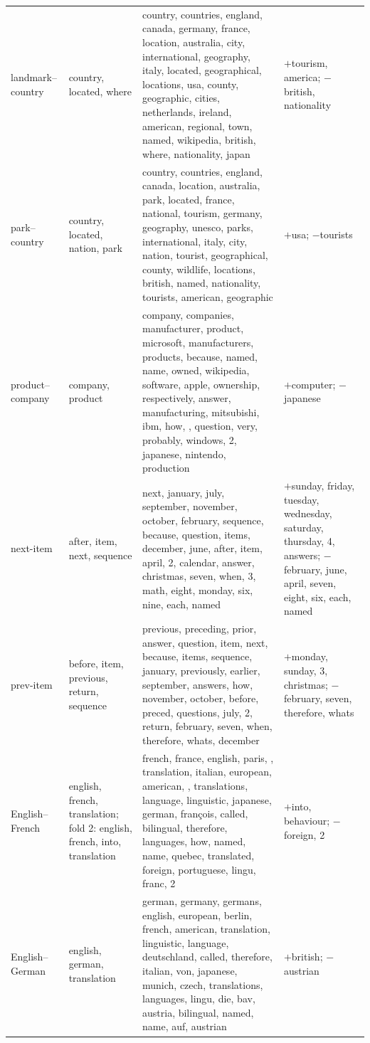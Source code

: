 \begin{xltabular}{\textwidth}{@{}>{\raggedright\arraybackslash}p{1.9cm}>{\raggedright\arraybackslash}p{2.3cm}>{\raggedright\arraybackslash}X>{\raggedright\arraybackslash}p{2.9cm}@{}}
landmark--country & country, located, where & country, countries, england, canada, germany, france, location, australia, city, international, geography, italy, located, geographical, locations, usa, county, geographic, cities, netherlands, ireland, american, regional, town, named, wikipedia, british, where, nationality, japan & $+$tourism, america; $-$british, nationality \\
park--country & country, located, nation, park & country, countries, england, canada, location, australia, park, located, france, national, tourism, germany, geography, unesco, parks, international, italy, city, nation, tourist, geographical, county, wildlife, locations, british, named, nationality, tourists, american, geographic & $+$usa; $-$tourists \\
product--company & company, product & company, companies, manufacturer, product, microsoft, manufacturers, products, because, named, name, owned, wikipedia, software, apple, ownership, respectively, answer, manufacturing, mitsubishi, ibm, how, , question, very, probably, windows, 2, japanese, nintendo, production & $+$computer; $-$japanese \\
next-item & after, item, next, sequence & next, january, july, september, november, october, february, sequence, because, question, items, december, june, after, item, april, 2, calendar, answer, christmas, seven, when, 3, math, eight, monday, six, nine, each, named & $+$sunday, friday, tuesday, wednesday, saturday, thursday, 4, answers; $-$february, june, april, seven, eight, six, each, named \\
prev-item & before, item, previous, return, sequence & previous, preceding, prior, answer, question, item, next, because, items, sequence, january, previously, earlier, september, answers, how, november, october, before, preced, questions, july, 2, return, february, seven, when, therefore, whats, december & $+$monday, sunday, 3, christmas; $-$february, seven, therefore, whats \\
English--French & english, french, translation; fold 2: english, french, into, translation & french, france, english, paris, , translation, italian, european, american, , translations, language, linguistic, japanese, german, françois, called, bilingual, therefore, languages, how, named, name, quebec, translated, foreign, portuguese, lingu, franc, 2 & $+$into, behaviour; $-$foreign, 2 \\
English--German & english, german, translation & german, germany, germans, english, european, berlin, french, american, translation, linguistic, language, deutschland, called, therefore, italian, von, japanese, munich, czech, translations, languages, lingu, die, bav, austria, bilingual, named, name, auf, austrian & $+$british; $-$austrian \\

\end{xltabular}

